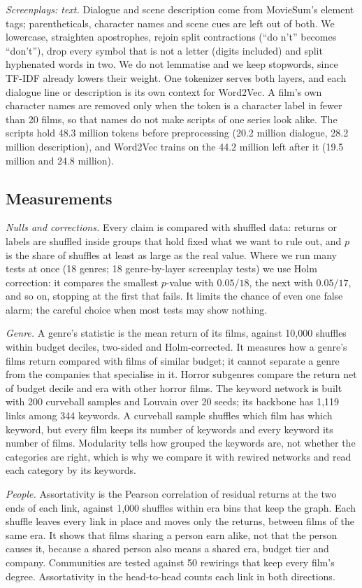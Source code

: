 \documentclass[9pt,twocolumn,twoside]{pnas-new}
\begin{document}
{\emph{Screenplays: text.} Dialogue and scene description come from MovieSum's element tags; parentheticals, character names and scene cues are left out of both. We lowercase, straighten apostrophes, rejoin split contractions (``do n't'' becomes ``don't''), drop every symbol that is not a letter (digits included) and split hyphenated words in two. We do not lemmatise and we keep stopwords, since TF-IDF already lowers their weight. One tokenizer serves both layers, and each dialogue line or description is its own context for Word2Vec. A film's own character names are removed only when the token is a character label in fewer than 20 films, so that names do not make scripts of one series look alike. The scripts hold 48.3 million tokens before preprocessing (20.2 million dialogue, 28.2 million description), and Word2Vec trains on the 44.2 million left after it (19.5 million and 24.8 million).

\subsection*{Measurements}
\emph{Nulls and corrections.} Every claim is compared with shuffled data: returns or labels are shuffled inside groups that hold fixed what we want to rule out, and $p$ is the share of shuffles at least as large as the real value. Where we run many tests at once (18 genres; 18 genre-by-layer screenplay tests) we use Holm correction: it compares the smallest $p$-value with $0.05/18$, the next with $0.05/17$, and so on, stopping at the first that fails. It limits the chance of even one false alarm; the careful choice when most tests may show nothing.

\emph{Genre.} A genre's statistic is the mean return of its films, against 10,000 shuffles within budget deciles, two-sided and Holm-corrected. It measures how a genre's films return compared with films of similar budget; it cannot separate a genre from the companies that specialise in it. Horror subgenres compare the return net of budget decile and era with other horror films. The keyword network is built with 200 curveball samples and Louvain over 20 seeds; its backbone has 1,119 links among 344 keywords. A curveball sample shuffles which film has which keyword, but every film keeps its number of keywords and every keyword its number of films. Modularity tells how grouped the keywords are, not whether the categories are right, which is why we compare it with rewired networks and read each category by its keywords.

\emph{People.} Assortativity is the Pearson correlation of residual returns at the two ends of each link, against 1,000 shuffles within era bins that keep the graph. Each shuffle leaves every link in place and moves only the returns, between films of the same era. It shows that films sharing a person earn alike, not that the person causes it, because a shared person also means a shared era, budget tier and company. Communities are tested against 50 rewirings that keep every film's degree. Assortativity in the head-to-head counts each link in both directions.

}
\end{document}
